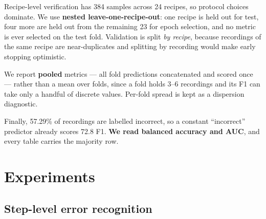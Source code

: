 \documentclass[10pt,twocolumn,letterpaper]{article}
\begin{document}
Recipe-level verification has 384 samples across 24 recipes, so protocol choices
dominate. We use \textbf{nested leave-one-recipe-out}: one recipe is held out for
test, four more are held out from the remaining 23 for epoch selection, and no
metric is ever selected on the test fold. Validation is split \emph{by recipe},
because recordings of the same recipe are near-duplicates and splitting by
recording would make early stopping optimistic.

We report \textbf{pooled} metrics --- all fold predictions concatenated and scored
once --- rather than a mean over folds, since a fold holds 3--6 recordings and its
F1 can take only a handful of discrete values. Per-fold spread is kept as a
dispersion diagnostic.

Finally, 57.29\% of recordings are labelled incorrect, so a constant ``incorrect''
predictor already scores 72.8 F1. \textbf{We read balanced accuracy and AUC}, and
every table carries the majority row.

\section{Experiments}

\subsection{Step-level error recognition}
\end{document}
